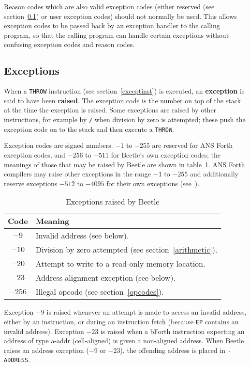 \documentclass{article}
\newcommand{\spic}[1]{{\spfont\setlength{\baselineskip}{\normalbaselineskip}#1\/}}
\begin{document}
Reason codes which are also valid exception codes (either reserved (see section~\ref{exceptions})
or user exception codes) should not normally be used. This
allows exception codes to be passed back by an exception handler to the calling
program, so that the calling program can handle certain exceptions without
confusing exception codes and reason codes.


\subsection{Exceptions}
\label{exceptions}

When a {\tt THROW} instruction (see section~\ref{exceptinst}) is executed, an
{\bf exception} is said to have been {\bf raised}. The exception code is the number on top of the
stack at the time the exception is raised. Some exceptions are raised by
other instructions, for example by {\tt /} when division by zero is attempted;
these push the exception code on to the stack and then execute a {\tt THROW}.

Exception codes are signed numbers. $-1$ to $-255$ are reserved for ANS Forth
exception codes, and $-256$ to $-511$ for Beetle's own exception codes; the meanings
of those that may be raised by Beetle are shown in table~\ref{excepttable}. ANS
Forth compilers may raise other exceptions in the range $-1$ to $-255$ and
additionally reserve exceptions $-512$ to $-4095$ for their own exceptions
(see~\cite[section 9.3.1]{ANSIforth}).

\begin{table}[htbp]
\begin{center}
\begin{tabular}{cl} \toprule
\bf Code & \bf Meaning \\ \midrule
$-9$ & Invalid address (see below). \\
$-10$ & Division by zero attempted (see section~\ref{arithmetic}). \\
$-20$ & Attempt to write to a read-only memory location. \\
$-23$ & Address alignment exception (see below). \\
$-256$ & Illegal opcode (see section~\ref{opcodes}). \\ \bottomrule
\end{tabular}
\caption{\label{excepttable}Exceptions raised by Beetle}
\end{center}
\end{table}

Exception $-9$ is raised whenever an attempt is made to access an invalid
address, either by an
instruction, or during an instruction fetch (because {\tt EP} contains an
invalid address). Exception $-23$ is raised when a bForth instruction expecting
an address of type \spic{a-addr} (cell-aligned) is given a non-aligned address.
When Beetle raises an address exception ($-9$ or $-23$), the offending address
is placed in {\tt -ADDRESS}.
\end{document}
